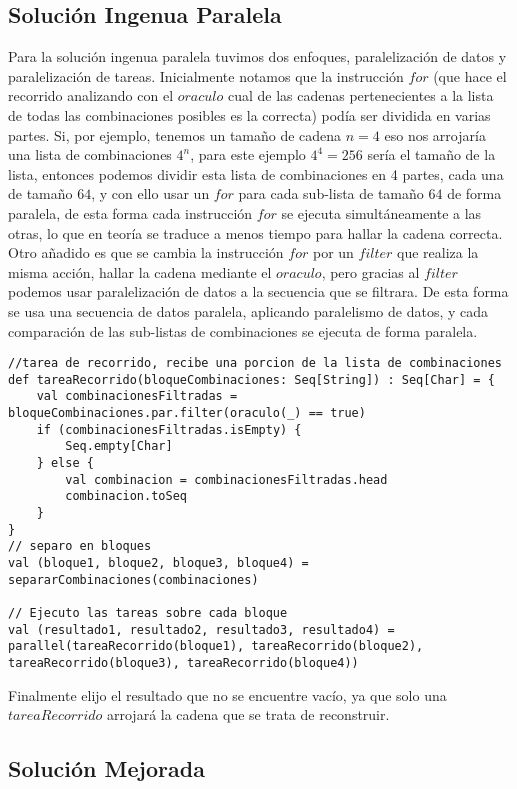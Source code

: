 \documentclass[conference]{IEEEtran}
\begin{document}
\subsection{\textbf{Solución Ingenua Paralela}}

Para la solución ingenua paralela tuvimos dos enfoques, paralelización de datos y paralelización de tareas. Inicialmente notamos que la instrucción $for$ (que hace el recorrido analizando con el $oraculo$ cual de las cadenas pertenecientes a la lista de todas las combinaciones posibles es la correcta) podía ser dividida en varias partes. Si, por ejemplo, tenemos un tamaño de cadena $n=4$ eso nos arrojaría una lista de combinaciones $4^n$, para este ejemplo $ 4^4 = 256$ sería el tamaño de la lista, entonces podemos dividir esta lista de combinaciones en 4 partes, cada una de tamaño $64$, y con ello usar un $for$ para cada sub-lista de tamaño $64$ de forma paralela, de esta forma cada instrucción $for$ se ejecuta simultáneamente a las otras, lo que en teoría se traduce a menos tiempo para hallar la cadena correcta. Otro añadido es que se cambia la instrucción $for$ por un $filter$ que realiza la misma acción, hallar la cadena mediante el $oraculo$, pero gracias al $filter$ podemos usar paralelización de datos a la secuencia que se filtrara. De esta forma se usa una secuencia de datos paralela, aplicando paralelismo de datos, y cada comparación de las sub-listas de combinaciones se ejecuta de forma paralela.

\begin{lstlisting}
//tarea de recorrido, recibe una porcion de la lista de combinaciones
def tareaRecorrido(bloqueCombinaciones: Seq[String]) : Seq[Char] = {
    val combinacionesFiltradas = bloqueCombinaciones.par.filter(oraculo(_) == true)
    if (combinacionesFiltradas.isEmpty) {
        Seq.empty[Char] 
    } else {
        val combinacion = combinacionesFiltradas.head
        combinacion.toSeq
    }  
}
// separo en bloques
val (bloque1, bloque2, bloque3, bloque4) = separarCombinaciones(combinaciones)

// Ejecuto las tareas sobre cada bloque
val (resultado1, resultado2, resultado3, resultado4) = parallel(tareaRecorrido(bloque1), tareaRecorrido(bloque2), tareaRecorrido(bloque3), tareaRecorrido(bloque4))
\end{lstlisting}
Finalmente elijo el resultado que no se encuentre vacío, ya que solo una $tareaRecorrido$ arrojará la cadena que se trata de reconstruir.

\subsection{\textbf{Solución Mejorada}}
\end{document}
